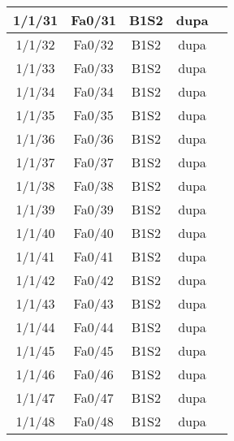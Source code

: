 \begin{center}
\begin{longtable}{|c|c|c|c|c|}
	1/1/31 & Fa0/31 & B1S2 & dupa \\ \hline
	1/1/32 & Fa0/32 & B1S2 & dupa \\ \hline
	1/1/33 & Fa0/33 & B1S2 & dupa \\ \hline
	1/1/34 & Fa0/34 & B1S2 & dupa \\ \hline
	1/1/35 & Fa0/35 & B1S2 & dupa \\ \hline
	1/1/36 & Fa0/36 & B1S2 & dupa \\ \hline
	1/1/37 & Fa0/37 & B1S2 & dupa \\ \hline
	1/1/38 & Fa0/38 & B1S2 & dupa \\ \hline
	1/1/39 & Fa0/39 & B1S2 & dupa \\ \hline
	1/1/40 & Fa0/40 & B1S2 & dupa \\ \hline
	1/1/41 & Fa0/41 & B1S2 & dupa \\ \hline
	1/1/42 & Fa0/42 & B1S2 & dupa \\ \hline
	1/1/43 & Fa0/43 & B1S2 & dupa \\ \hline
	1/1/44 & Fa0/44 & B1S2 & dupa \\ \hline
	1/1/45 & Fa0/45 & B1S2 & dupa \\ \hline
	1/1/46 & Fa0/46 & B1S2 & dupa \\ \hline
	1/1/47 & Fa0/47 & B1S2 & dupa \\ \hline
	1/1/48 & Fa0/48 & B1S2 & dupa \\ \hline
    \end{longtable}
\end{center}

